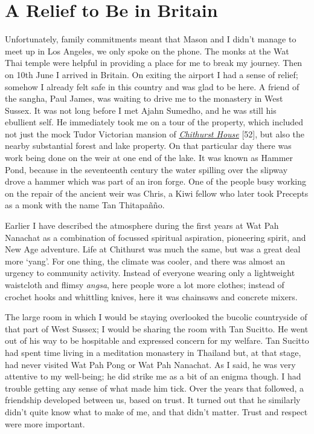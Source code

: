 \chapter{A Relief to Be in Britain}

Unfortunately, family commitments meant that Mason and I didn't manage
to meet up in Los Angeles, we only spoke on the phone. The monks at the
Wat Thai temple were helpful in providing a place for me to break my
journey. Then on 10th June I arrived in Britain. On exiting the airport
I had a sense of relief; somehow I already felt safe in this country and
was glad to be here. A friend of the sangha, Paul James, was waiting to
drive me to the monastery in West Sussex. It was not long before I met
Ajahn Sumedho, and he was still his ebullient self. He immediately took
me on a tour of the property, which included not just the mock Tudor
Victorian mansion of
\href{https://www.cittaviveka.org/chithurst-house}{\emph{\underline{Chithurst
House}}} {[}52{]}, but also the nearby substantial forest and lake
property. On that particular day there was work being done on the weir
at one end of the lake. It was known as Hammer Pond, because in the
seventeenth century the water spilling over the slipway drove a hammer
which was part of an iron forge. One of the people busy working on the
repair of the ancient weir was Chris, a Kiwi fellow who later took
Precepts as a monk with the name Tan Thitapañño.

Earlier I have described the atmosphere during the first years at Wat
Pah Nanachat as a combination of focussed spiritual aspiration,
pioneering spirit, and New Age adventure. Life at Chithurst was much the
same, but was a great deal more `yang'. For one thing, the climate was
cooler, and there was almost an urgency to community activity. Instead
of everyone wearing only a lightweight waistcloth and flimsy
\emph{angsa}, here people wore a lot more clothes; instead of crochet
hooks and whittling knives, here it was chainsaws and concrete mixers.

The large room in which I would be staying overlooked the bucolic
countryside of that part of West Sussex; I would be sharing the room
with Tan Sucitto. He went out of his way to be hospitable and expressed
concern for my welfare. Tan Sucitto had spent time living in a
meditation monastery in Thailand but, at that stage, had never visited
Wat Pah Pong or Wat Pah Nanachat. As I said, he was very attentive to my
well-being; he did strike me as a bit of an enigma though. I had trouble
getting any sense of what made him tick. Over the years that followed, a
friendship developed between us, based on trust. It turned out that he
similarly didn't quite know what to make of me, and that didn't matter.
Trust and respect were more important.


